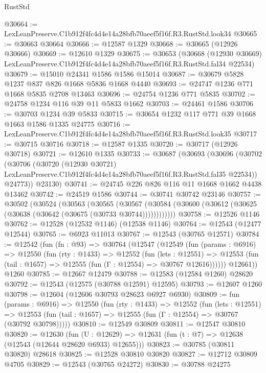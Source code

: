 \begin{lexlean}{RustStd}
\begin{coremodule}
@30664 := LexLeanPreserve.C1b912f4fc4d4e14a28bfb70aeef5f16f.R3.RustStd.look34
@30665 := @30663 @30664
@30666 := @12587 @1329
@30668 := @30665 (@12926 @30666)
@30669 := @12610 @1329
@30675 := @30653
    (@30668
      (@12930 @30669)
      LexLeanPreserve.C1b912f4fc4d4e14a28bfb70aeef5f16f.R3.RustStd.fal34
      @22534)
@30679 := @15010 @24341 @1586 @1586 @15014
@30687 := @30679 @5828 @1237 @837 @826 @1668 @5836 @1668 @4440
@30693 := @24747 @1236 @771 @1668 @5835 @2708 @13463
@30696 := @24754 @1236 @771 @5835
@30702 := @24758 @1234 @116 @39 @11 @5833 @1662
@30703 := @24461 @1586
@30706 := @30703 @1234 @39 @5833
@30715 := @30654 @1232 @117 @771 @39 @1668 @1663 @1586 @1335 @24775
@30716 := LexLeanPreserve.C1b912f4fc4d4e14a28bfb70aeef5f16f.R3.RustStd.look35
@30717 := @30715 @30716
@30718 := @12587 @1335
@30720 := @30717 (@12926 @30718)
@30721 := @12610 @1335
@30733 := @30687
    (@30693
      (@30696
        (@30702
          (@30706
            (@30720
              (@12930 @30721)
              LexLeanPreserve.C1b912f4fc4d4e14a28bfb70aeef5f16f.R3.RustStd.fal35
              @22534))
          @24773))
      @23130)
@30741 := @24745 @226 @826 @116 @11 @1668 @1662 @4438 @13462
@30742 := @24519 @1586
@30744 := @30741 @30742 @23146
@30757 := @30502
    (@30524
      (@30563
        (@30565
          (@30567 (@30584 (@30600 (@30612 (@30625 (@30638 (@30642 (@30675 (@30733 @30744))))))))))))
@30758 := @12526 @1146
@30762 := @12528 (@12532 @1146) (@12538 @1146)
@30764 := @12543 (@12477 @12544)
@30765 := @6923 @11013
@30767 := @12543 (@30765 @12571)
@30784 := @12542
    (fun (fn : @93) =>
    @30764
      (@12547
        (@12549
          (fun (params : @6916) =>
          @12550
            (fun (rty : @1433) =>
            @12552
              (fun (lets : @12551) =>
              @12553 (fun (tail : @1657) => @12555 (fun (Γ : @12554) => @30767 @12616))))))
        @12661))
    @1260
@30785 := @12667 @12479
@30788 := @12583 (@12584 @1260) @28620
@30792 := @12543 (@12575 (@30788 @12591) @12595)
@30793 := @12607 @1260
@30798 := @12604 (@12606 @30793 @28623 @6927 @6930)
@30809 := fun (params : @6916) =>
  @12550
    (fun (rty : @1433) =>
    @12552
      (fun (lets : @12551) =>
      @12553 (fun (tail : @1657) => @12555 (fun (Γ : @12554) => @30767 (@30792 @30798)))))
@30810 := @12549 @30809
@30811 := @12547 @30810
@30820 := @12630
    (fun (U : @12629) => @12631 (fun (t : @7) => @12638 (@12543 (@12644 @28620 @6933) @12655)))
@30823 := @30785 (@30811 @30820) @28618
@30825 := @12528 @30810 @30820
@30827 := @12712 @30809 @4705
@30829 := @12543 (@30765 @24272)
@30830 := @30788 @24275

\end{coremodule}
\end{lexlean}
